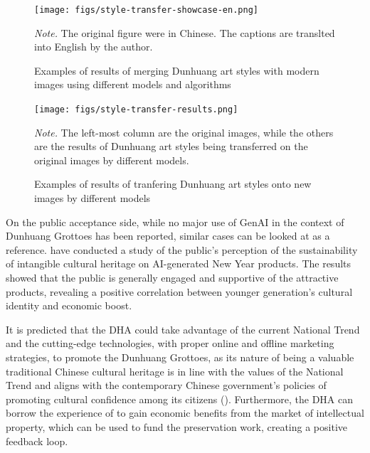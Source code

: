 \begin{figure}
    \caption{Examples of results of merging Dunhuang art styles with modern images using different 
    models and algorithms}
    \label{fig:style-transfer-showcase}
    
    \begin{center}
        \texttt{[image: figs/style-transfer-showcase-en.png]}
    \end{center}

    \small\textit{Note.} The original figure were in Chinese. The captions are translted into English
    by the author. 
\end{figure}

\begin{figure}
    \caption{Examples of results of tranfering Dunhuang art styles onto new images by different models}
    \label{fig:style-transfer-showcase-2}

    \begin{center}
        \texttt{[image: figs/style-transfer-results.png]}
    \end{center}

    \small\textit{Note.} The left-most column are the original images, while the others are the results of
    Dunhuang art styles being transferred on the original images by different models.
\end{figure}

On the public acceptance side, while no major use of GenAI in the context of Dunhuang Grottoes has been reported,
similar cases can be looked at as a reference.  have conducted a study
of the public's perception of the sustainability of intangible cultural heritage on AI-generated New Year products.
The results showed that the public is generally engaged and supportive of the attractive products, revealing a
positive correlation between younger generation's cultural identity and economic boost.

It is predicted that the DHA could take advantage of the current National Trend and the cutting-edge technologies,
with proper online and offline marketing strategies, to promote the Dunhuang Grottoes, as its nature of being a
valuable traditional Chinese cultural heritage is in line with the values of the National Trend and aligns with
the contemporary Chinese government's policies of promoting cultural confidence among its citizens
(). Furthermore, the DHA can borrow the experience of
 to gain economic benefits from the market of intellectual
property, which can be used to fund the preservation work, creating a positive feedback loop.

